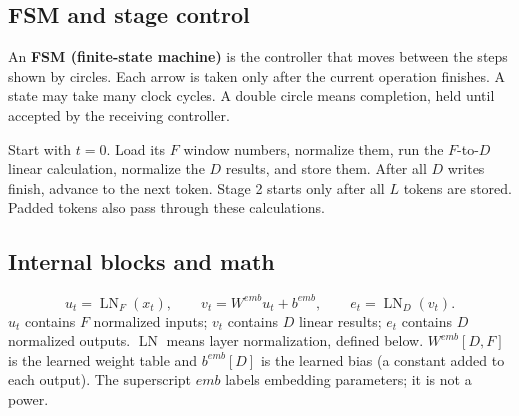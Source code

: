 \documentclass[11pt,a4paper]{article}
\newcommand{\LN}{\operatorname{LN}}
\begin{document}
\subsection*{FSM and stage control}
An \textbf{FSM (finite-state machine)} is the controller that moves between the steps shown by circles. Each arrow is taken only after the current operation finishes. A state may take many clock cycles. A double circle means completion, held until accepted by the receiving controller.
\begin{center}
\end{center}
Start with $t=0$. Load its $F$ window numbers, normalize them, run the $F$-to-$D$ linear calculation, normalize the $D$ results, and store them. After all $D$ writes finish, advance to the next token. Stage 2 starts only after all $L$ tokens are stored. Padded tokens also pass through these calculations.

\subsection*{Internal blocks and math}
\[
u_t=\LN_F(x_t),\qquad v_t=W^{emb}u_t+b^{emb},\qquad e_t=\LN_D(v_t).
\]
$u_t$ contains $F$ normalized inputs; $v_t$ contains $D$ linear results; $e_t$ contains $D$ normalized outputs. $\LN$ means layer normalization, defined below. $W^{emb}[D,F]$ is the learned weight table and $b^{emb}[D]$ is the learned bias (a constant added to each output). The superscript $emb$ labels embedding parameters; it is not a power.
\end{document}
